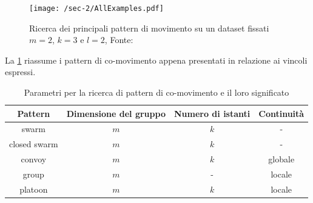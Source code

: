 \begin{figure}
  \centering
  \texttt{[image: /sec-2/AllExamples.pdf]}
  \caption{Ricerca dei principali pattern di movimento su un dataset fissati \(m=2\), \(k=3\) e \(l=2\), Fonte:~\cite{DBLP:journals/pvldb/FanZWT16}}%
  \label{fig:chap-1:AllExample}
\end{figure}

La \cref{tab:co-movement-pattern-list} riassume i pattern di co-movimento appena presentati in relazione ai vincoli espressi.

\begin{table}[H]
    \centering
   \begin{tabular}{||c c c c||}
 \hline
     Pattern & Dimensione del gruppo & Numero di istanti & Continuità \\ [0.4ex] 
 \hline\hline
     swarm & \(m\) & \(k\) & - \\ 
 \hline
    closed swarm & \(m\) & \(k\) & - \\ 
 \hline
     convoy & \(m\) & \(k\) & globale \\ 
  \hline
     group & \(m\) & - & locale \\
  \hline
    platoon & \(m\) & \(k\) & locale \\ 
 \hline
\end{tabular}
    \caption{Parametri per la ricerca di pattern di co-movimento e il loro significato}
    \label{tab:co-movement-pattern-list}
\end{table}
